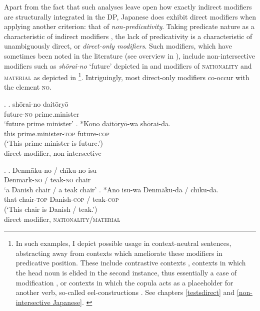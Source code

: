 \documentclass [output=book,colorlinks,citecolor=brown]{langscibook}
\begin{document}
Apart from the fact that such analyses leave open how exactly indirect modifiers are structurally integrated in the DP, Japanese does exhibit direct modifiers when applying another criterion: that of \textit{non-predicativity}. Taking predicate nature as a characteristic of indirect modifiers \citep{bolinger:1967:adj, alex:2007:nounphrase, cinque:2010:adj, panayidou:2013:in}, the lack of predicativity is a characteristic of unambiguously direct, or \textit{direct-only modifiers}. Such modifiers, which have sometimes been noted in the literature (see overview in \citealt{watanabe:2017:attributive}), include non-intersective modifiers such as \textit{shōrai-no} `future’ depicted in  and modifiers of \textsc{nationality} and \textsc{material} as depicted in \footnote{In such examples, I depict possible usage in context-neutral sentences, abstracting away from contexts which ameliorate these modifiers in predicative position. These include contrastive contexts \citep{hoshi:2002:kaynean}, contexts in which the head noun is elided in the second instance, thus essentially a case of modification \citep{nagano:2018:conversion}, or contexts in which the copula acts as a placeholder for another verb, so-called eel-constructions \citep{okutsu:1978:boku}. See chapters \ref{testsdirect} and \ref{non-intersective Japanese}. \label{foonoteeel}}. Intriguingly, most direct-only modifiers co-occur with the element \textsc{no}. %

\ex. \label{shorai} \ag. shōrai-no daitōryō\\
future-\textsc{no} prime.minister\\
`future prime minister’
\bg. *Kono daitōryō-wa shōrai-da.\\
this prime.minister-\textsc{top} future-\textsc{cop}\\
(`This prime minister is future.’) \\ \null \hfill direct modifier, non-intersective

\ex. \label{denmaku1} \ag. Denmāku-no / chīku-no isu\\
Denmark-\textsc{no} / teak-\textsc{no} chair\\
`a Danish chair / a teak chair'
\bg. *Ano isu-wa Denmāku-da / chīku-da.\\
that chair-\textsc{top} Danish-\textsc{cop} / teak-\textsc{cop}\\
(`This chair is Danish / teak.’) \\ \null \hfill direct modifier, \textsc{nationality/material}
\end{document}
